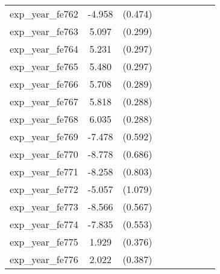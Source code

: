 {\begin{tabular}{l*{4}{cc}}
exp\_year\_fe762&   -4.958\sym{***}&  (0.474)&                  &         &                  &         &                  &         \\
exp\_year\_fe763&    5.097\sym{***}&  (0.299)&                  &         &                  &         &                  &         \\
exp\_year\_fe764&    5.231\sym{***}&  (0.297)&                  &         &                  &         &                  &         \\
exp\_year\_fe765&    5.480\sym{***}&  (0.297)&                  &         &                  &         &                  &         \\
exp\_year\_fe766&    5.708\sym{***}&  (0.289)&                  &         &                  &         &                  &         \\
exp\_year\_fe767&    5.818\sym{***}&  (0.288)&                  &         &                  &         &                  &         \\
exp\_year\_fe768&    6.035\sym{***}&  (0.288)&                  &         &                  &         &                  &         \\
exp\_year\_fe769&   -7.478\sym{***}&  (0.592)&                  &         &                  &         &                  &         \\
exp\_year\_fe770&   -8.778\sym{***}&  (0.686)&                  &         &                  &         &                  &         \\
exp\_year\_fe771&   -8.258\sym{***}&  (0.803)&                  &         &                  &         &                  &         \\
exp\_year\_fe772&   -5.057\sym{***}&  (1.079)&                  &         &                  &         &                  &         \\
exp\_year\_fe773&   -8.566\sym{***}&  (0.567)&                  &         &                  &         &                  &         \\
exp\_year\_fe774&   -7.835\sym{***}&  (0.553)&                  &         &                  &         &                  &         \\
exp\_year\_fe775&    1.929\sym{***}&  (0.376)&                  &         &                  &         &                  &         \\
exp\_year\_fe776&    2.022\sym{***}&  (0.387)&                  &         &                  &         &                  &         \\

\end{tabular}}
